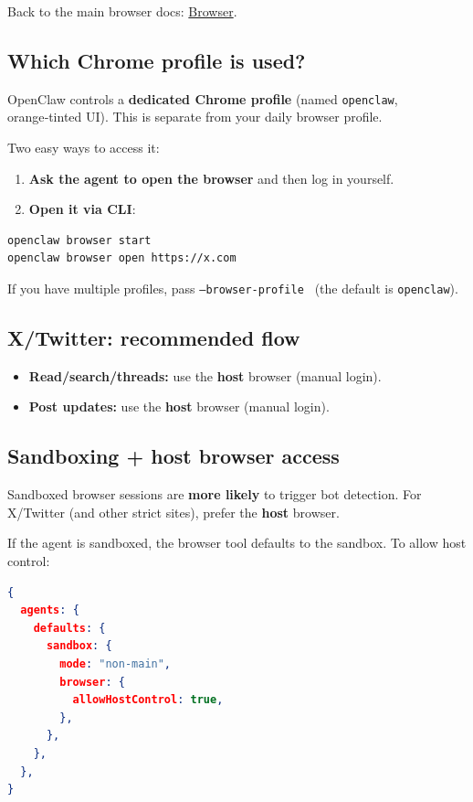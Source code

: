 Back to the main browser docs: \href{/tools/browser}{Browser}.

\subsection{Which Chrome profile is used?}


OpenClaw controls a \textbf{dedicated Chrome profile} (named \texttt{openclaw}, orange‑tinted UI). This is separate from your daily browser profile.

Two easy ways to access it:

\begin{enumerate}
  \item \textbf{Ask the agent to open the browser} and then log in yourself.
  \item \textbf{Open it via CLI}:
\end{enumerate}


\begin{lstlisting}[language=bash]
openclaw browser start
openclaw browser open https://x.com
\end{lstlisting}


If you have multiple profiles, pass \texttt{--browser-profile } (the default is \texttt{openclaw}).

\subsection{X/Twitter: recommended flow}


\begin{itemize}
  \item \textbf{Read/search/threads:} use the \textbf{host} browser (manual login).
  \item \textbf{Post updates:} use the \textbf{host} browser (manual login).
\end{itemize}


\subsection{Sandboxing + host browser access}


Sandboxed browser sessions are \textbf{more likely} to trigger bot detection. For X/Twitter (and other strict sites), prefer the \textbf{host} browser.

If the agent is sandboxed, the browser tool defaults to the sandbox. To allow host control:

\begin{lstlisting}[language=json]
{
  agents: {
    defaults: {
      sandbox: {
        mode: "non-main",
        browser: {
          allowHostControl: true,
        },
      },
    },
  },
}
\end{lstlisting}


